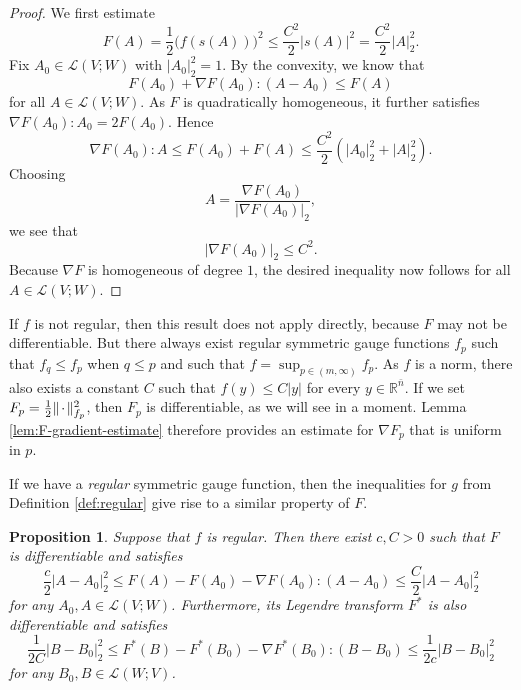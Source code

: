 \documentclass[10pt,a4paper]{amsart}
\newcommand{\R}{\mathbb{R}}
\newcommand{\ndim}{{\bar{n}}}
\newcommand{\Lin}{\mathcal{L}}
\newcommand{\blank}{{\mkern 2mu\cdot\mkern 2mu}}
\newtheorem{proposition}[theorem]{Proposition}
\begin{document}
\begin{proof}
We first estimate
\[
F(A) = \frac{1}{2} \bigl(f(s(A))\bigr)^2 \le \frac{C^2}{2} |s(A)|^2 = \frac{C^2}{2} |A|_2^2.
\]
Fix $A_0 \in \Lin(V; W)$ with $|A_0|_2^2 = 1$. By the convexity, we know that
\[
F(A_0) + \nabla F(A_0) : (A - A_0) \le F(A)
\]
for all $A \in \Lin(V; W)$. As $F$ is quadratically homogeneous, it further satisfies $\nabla F(A_0) : A_0 = 2 F(A_0)$. Hence
\[
\nabla F(A_0) : A \le F(A_0) + F(A) \le \frac{C^2}{2}(|A_0|_2^2 + |A|_2^2).
\]
Choosing
\[
A = \frac{\nabla F(A_0)}{|\nabla F(A_0)|_2},
\]
we see that
\[
|\nabla F(A_0)|_2 \le C^2.
\]
Because $\nabla F$ is homogeneous of degree $1$, the desired inequality now follows for all $A \in \Lin(V; W)$.
\end{proof}

If $f$ is not regular, then this result does not apply directly, because
$F$ may not be differentiable. But there always exist regular symmetric gauge
functions $f_p$ such that $f_q \le f_p$ when $q \le p$ and such that
$f = \sup_{p \in (m, \infty)} f_p$. As $f$ is a norm, there also
exists a constant $C$ such that
$f(y) \le C|y|$ for every $y \in \R^\ndim$. If we set $F_p = \frac{1}{2} \|\blank\|_{f_p}^2$, then $F_p$ is differentiable, as we will see in a moment.
Lemma \ref{lem:F-gradient-estimate} therefore
provides an estimate for $\nabla F_p$ that is uniform in $p$.

If we have a \emph{regular} symmetric gauge function, then the inequalities for $g$
from Definition \ref{def:regular} give rise to a similar property of $F$.

\begin{proposition} \label{prp:regular}
Suppose that $f$ is regular. Then there exist $c, C > 0$ such that $F$ is differentiable and satisfies
\begin{equation} \label{eq:Hessian-estimate-F}
\frac{c}{2} |A - A_0|_2^2 \le F(A) - F(A_0) - \nabla F(A_0) : (A - A_0) \le \frac{C}{2} |A - A_0|_2^2
\end{equation}
for any $A_0, A \in \Lin(V; W)$. Furthermore, its Legendre transform $F^*$ is also differentiable and satisfies
\begin{equation} \label{eq:Hessian-estimate-F*}
\frac{1}{2C} |B - B_0|_2^2 \le F^*(B) - F^*(B_0) - \nabla F^*(B_0) : (B - B_0) \le \frac{1}{2c} |B - B_0|_2^2
\end{equation}
for any $B_0, B \in \Lin(W; V)$.
\end{proposition}
\end{document}
